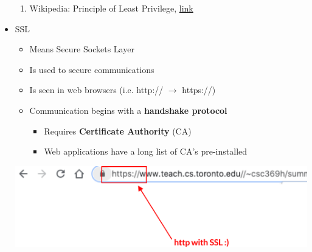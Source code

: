 \documentclass[12pt]{article}
\begin{document}
\begin{itemize}
    \begin{enumerate}[1)]
        \item Wikipedia: Principle of Least Privilege, \href{https://en.wikipedia.org/wiki/Principle_of_least_privilege}{link}
    \end{enumerate}
    \item SSL
    \begin{itemize}
        \item Means Secure Sockets Layer
        \item Is used to secure communications
        \item Is seen in web browsers (i.e. http:// $\to$ https://)
        \item Communication begins with a \textbf{handshake protocol}
        \begin{itemize}
            \item Requires \textbf{Certificate Authority} (CA)
            \item Web applications have a long list of CA's pre-installed
        \end{itemize}
    \end{itemize}

    \begin{center}
        \includegraphics[width=\linewidth]{../images/week_11_notes_1_6.png}
    \end{center}
\end{itemize}
\end{document}
